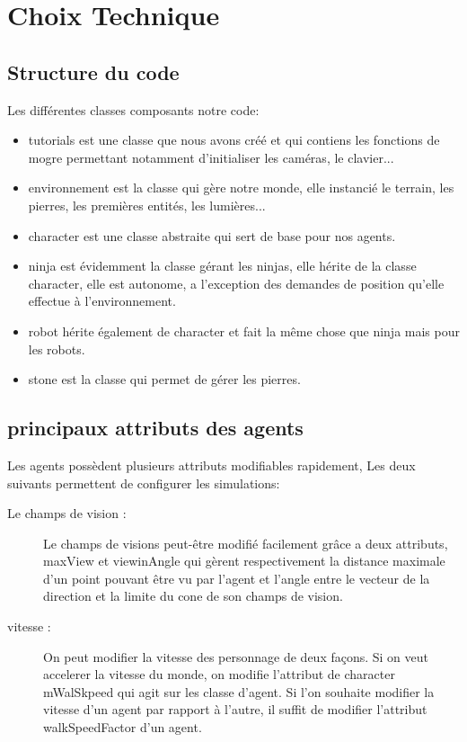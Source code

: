 \section{Choix Technique}
\thispagestyle{fancy}

\subsection{Structure du code}
Les différentes classes composants notre code:
\begin{itemize}
\item tutorials est une classe que nous avons créé et qui contiens les
  fonctions de mogre permettant notamment d'initialiser les caméras,
  le clavier...
\item environnement est la classe qui gère notre monde, elle instancié
  le terrain, les pierres, les premières entités, les lumières...
\item character est une classe abstraite qui sert de base pour nos
  agents.
\item ninja est évidemment la classe gérant les ninjas, elle hérite de
  la classe character, elle est autonome, a l'exception des demandes
  de position qu'elle effectue à l'environnement.
\item robot hérite également de character et fait la même chose que ninja mais pour les robots.
\item stone est la classe qui permet de gérer les pierres. 
\end{itemize}

\subsection{principaux attributs des agents}

Les agents possèdent plusieurs attributs modifiables rapidement, Les
deux suivants permettent de configurer les simulations:

\begin{description}
\item[Le champs de vision :] Le champs de visions peut-être modifié
  facilement grâce a deux attributs, maxView et viewinAngle qui gèrent
  respectivement la distance maximale d'un point pouvant être vu par
  l'agent et l'angle entre le vecteur de la direction et la limite du
  cone de son champs de vision.
\item[vitesse :] On peut modifier la vitesse des personnage de deux
  façons. Si on veut accelerer la vitesse du monde, on modifie
  l'attribut de character mWalSkpeed qui agit sur les classe
  d'agent. Si l'on souhaite modifier la vitesse d'un agent par rapport
  à l'autre, il suffit de modifier l'attribut walkSpeedFactor d'un
  agent.
\end{description}

